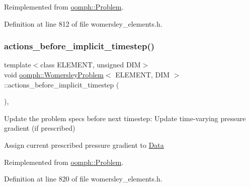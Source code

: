 Reimplemented from \hyperlink{classoomph_1_1Problem_a033ec7301123deeb7e56d04c38f9f1da}{oomph\+::\+Problem}.



Definition at line 812 of file womersley\+\_\+elements.\+h.

\mbox{\label{classoomph_1_1WomersleyProblem_af87f80658aaadaee2d7c8d0c06ad159e}} 
\subsubsection{\texorpdfstring{actions\+\_\+before\+\_\+implicit\+\_\+timestep()}{actions\_before\_implicit\_timestep()}}
{\footnotesize\ttfamily template$<$class E\+L\+E\+M\+E\+NT, unsigned D\+IM$>$ \\
void \hyperlink{classoomph_1_1WomersleyProblem}{oomph\+::\+Womersley\+Problem}$<$ E\+L\+E\+M\+E\+NT, D\+IM $>$\+::actions\+\_\+before\+\_\+implicit\+\_\+timestep (\begin{DoxyParamCaption}{ }\end{DoxyParamCaption})\hspace{0.3cm}{\ttfamily [inline]}, {\ttfamily [virtual]}}



Update the problem specs before next timestep\+: Update time-\/varying pressure gradient (if prescribed) 

Assign current prescribed pressure gradient to \hyperlink{classoomph_1_1Data}{Data} 

Reimplemented from \hyperlink{classoomph_1_1Problem_a4f19896906d2c0274ad6798cd3ac38dc}{oomph\+::\+Problem}.



Definition at line 820 of file womersley\+\_\+elements.\+h.

\mbox{\label{classoomph_1_1WomersleyProblem_a7aa82fe18099c9770edf9fa8e79a2028}} 
